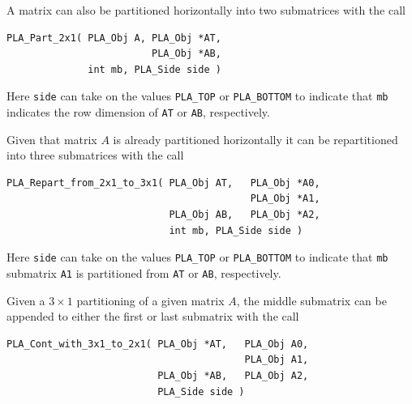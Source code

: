 A matrix can also be partitioned horizontally into two submatrices
with the call
\begin{FlaSpec}
\begin{verbatim}
PLA_Part_2x1( PLA_Obj A, PLA_Obj *AT,
                         PLA_Obj *AB, 
              int mb, PLA_Side side )
\end{verbatim}
\end{FlaSpec}
Here {\tt side} can take on the
values {\tt PLA\_TOP} or  {\tt PLA\_BOTTOM}
to indicate that {\tt mb} indicates 
the row dimension of {\tt AT} or {\tt AB},
respectively.

Given that matrix $ A $ is already partitioned horizontally
it can be repartitioned into three submatrices with the call
\begin{FlaSpec}
\begin{verbatim}
PLA_Repart_from_2x1_to_3x1( PLA_Obj AT,   PLA_Obj *A0, 
                                          PLA_Obj *A1, 
                            PLA_Obj AB,   PLA_Obj *A2, 
                            int mb, PLA_Side side )
\end{verbatim}
\end{FlaSpec}
Here {\tt side} can take on the
values {\tt PLA\_TOP} or  {\tt PLA\_BOTTOM}
to indicate that {\tt mb} submatrix {\tt A1} 
is partitioned from {\tt AT} or {\tt AB},
respectively.

Given a $ 3 \times 1 $ partitioning of a given matrix $ A $,
the middle submatrix can be appended to either the first or
last submatrix with the call
\begin{FlaSpec}
\begin{verbatim}
PLA_Cont_with_3x1_to_2x1( PLA_Obj *AT,   PLA_Obj A0, 
                                         PLA_Obj A1, 
                          PLA_Obj *AB,   PLA_Obj A2, 
                          PLA_Side side )
\end{verbatim}
\end{FlaSpec}

